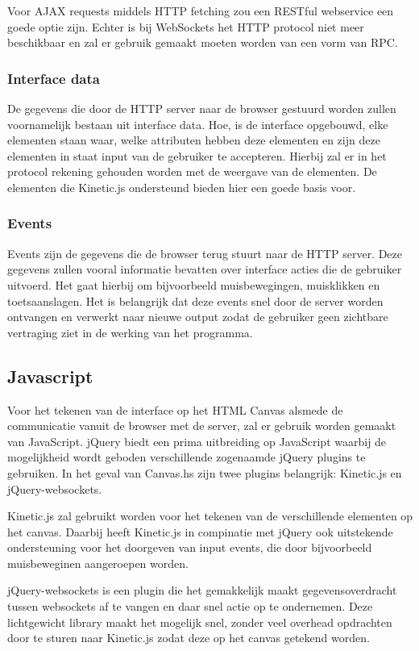 Voor AJAX requests middels HTTP fetching zou een RESTful webservice een goede optie zijn. Echter is bij WebSockets het HTTP protocol niet meer beschikbaar en zal er gebruik gemaakt moeten worden van een vorm van RPC. 
\subsubsection{Interface data}
De gegevens die door de HTTP server naar de browser gestuurd worden zullen voornamelijk bestaan uit interface data. Hoe, is de interface opgebouwd, elke elementen staan waar, welke attributen hebben deze elementen en zijn deze elementen in staat input van de gebruiker te accepteren. Hierbij zal er in het protocol rekening gehouden worden met de weergave van de elementen. De elementen die Kinetic.js ondersteund bieden hier een goede basis voor.
\subsubsection{Events}
Events zijn de gegevens die de browser terug stuurt naar de HTTP server. Deze gegevens zullen vooral informatie bevatten over interface acties die de gebruiker uitvoerd. Het gaat hierbij om bijvoorbeeld muisbewegingen, muisklikken en toetsaanslagen. Het is belangrijk dat deze events snel door de server worden ontvangen en verwerkt naar nieuwe output zodat de gebruiker geen zichtbare vertraging ziet in de werking van het programma.

\subsection{Javascript}
Voor het tekenen van de interface op het HTML Canvas alsmede de communicatie vanuit de browser met de server, zal er gebruik worden gemaakt van JavaScript. jQuery biedt een prima uitbreiding op JavaScript waarbij de mogelijkheid wordt geboden verschillende zogenaamde jQuery plugins te gebruiken. In het geval van Canvas.hs zijn twee plugins belangrijk: Kinetic.js en jQuery-websockets.

Kinetic.js zal gebruikt worden voor het tekenen van de verschillende elementen op het canvas. Daarbij heeft Kinetic.js in compinatie met jQuery ook uitstekende ondersteuning voor het doorgeven van input events, die door bijvoorbeeld muisbeweginen aangeroepen worden. 

jQuery-websockets is een plugin die het gemakkelijk maakt gegevensoverdracht tussen websockets af te vangen en daar snel actie op te ondernemen. Deze lichtgewicht library maakt het mogelijk snel, zonder veel overhead opdrachten door te sturen naar Kinetic.js zodat deze op het canvas getekend worden.

